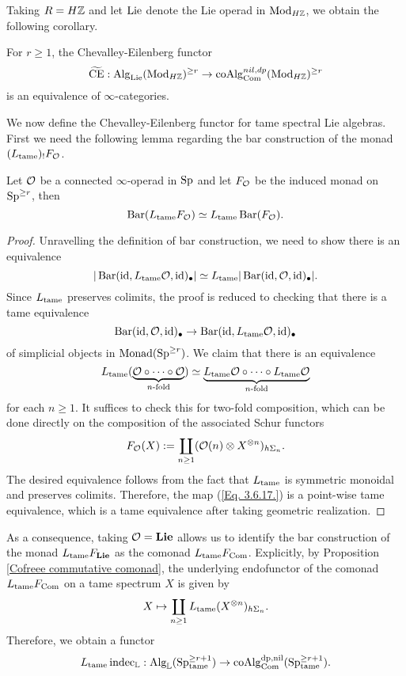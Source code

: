 Taking $R=H{\mathbb{Z}}$ and let $\operatorname{Lie}$ denote the Lie operad in $\operatorname{Mod}_{H{\mathbb{Z}}}$, we obtain the following corollary.
\begin{corollary}
	For $r\geq 1$, the Chevalley-Eilenberg functor 
	\[
	\widetilde{\operatorname{CE}}: \operatorname{Alg}_{\operatorname{Lie}}(\operatorname{Mod}_{H{\mathbb{Z}}})^{\geq r} \to \operatorname{coAlg}^{nil, dp}_{\operatorname{Com}}(\operatorname{Mod}_{H{\mathbb{Z}}})^{\geq r}
	\]
	is an equivalence of $\infty$-categories.
\end{corollary}

We now define the Chevalley-Eilenberg functor for tame spectral Lie algebras. First we need the following lemma regarding the bar construction of the monad $(L_{\operatorname{\operatorname{tame}}})_{!}F_{{\mathcal{O}}}$.
\begin{lemma}
    Let ${\mathcal{O}}$ be a connected $\infty$-operad in $ \operatorname{Sp}$ and let $F_{{\mathcal{O}}}$ be the induced monad on $\operatorname{Sp}^{\geq r}$,
    then 
    $$
    \operatorname{Bar}(L_{\operatorname{\operatorname{tame}}}F_{\mathcal{O}} ) \simeq L_{\operatorname{\operatorname{tame}}} \operatorname{Bar}(F_{\mathcal{O}}).
    $$
\end{lemma}
\begin{proof}
    Unravelling the definition of bar construction, we need to show there is an equivalence
    $$
     |\operatorname{Bar}(\operatorname{id}, L_{\operatorname{\operatorname{tame}}}{\mathcal{O}} , \operatorname{id})_{\bullet}|
     \simeq
     L_{\operatorname{\operatorname{tame}}}|\operatorname{Bar}(\operatorname{id}, {\mathcal{O}} , \operatorname{id})_{\bullet}|.
    $$
    Since $L_{\operatorname{\operatorname{tame}}}$ preserves colimits, the proof is reduced to checking that
    there is a tame equivalence
    \begin{equation}
    \label{Eq. 3.6.17.}
    \operatorname{Bar}(\operatorname{id}, {\mathcal{O}} , \operatorname{id})_{\bullet}
    \to 
    \operatorname{Bar}(\operatorname{id}, L_{\operatorname{\operatorname{tame}}}{\mathcal{O}} , \operatorname{id})_{\bullet}
    \end{equation}
    of simplicial objects in $\operatorname{Monad}(\operatorname{Sp}^{\geq r})$. 
    We claim that there is an equivalence
    $$
    L_{\operatorname{\operatorname{tame}}} (\underbrace{{\mathcal{O}} \circ \cdots \circ {\mathcal{O}}}_{\text{$n$-fold}} )
    \simeq 
    \underbrace{ L_{\operatorname{\operatorname{tame}}}{\mathcal{O}} \circ \cdots \circ  L_{\operatorname{\operatorname{tame}}}{\mathcal{O}}}_{\text{$n$-fold}} 
    $$
    for each $n\geq 1$.
    It suffices to check this for two-fold composition, which can be done directly on the composition of the associated Schur functors
    $$
    F_{{\mathcal{O}}}(X):= \coprod_{n\geq 1} ({\mathcal{O}}(n) \otimes X^{\otimes n})_{h\Sigma_n}.
    $$ 
    The desired equivalence follows from the fact that $L_{\operatorname{\operatorname{tame}}}$ is symmetric monoidal and preserves colimits.
    Therefore, the map (\ref{Eq. 3.6.17.}) is a point-wise tame equivalence, which is a tame equivalence after taking geometric realization.
\end{proof}

As a consequence, taking ${\mathcal{O}}=\mathbf{Lie}$ allows us to identify the bar construction of the monad $L_{\operatorname{\operatorname{tame}}}F_{\mathbf{Lie}}$ as the comonad $L_{\operatorname{\operatorname{tame}}}F_{\operatorname{Com}}$. Explicitly, by Proposition \ref{Cofreee commutative comonad}, the underlying endofunctor of the comonad $L_{\operatorname{\operatorname{tame}}}F_{\operatorname{Com}}$ on a tame spectrum $X$ is given by
$$
X \mapsto \coprod_{n\geq 1} L_{\operatorname{\operatorname{tame}}} (X^{\otimes n})_{h\Sigma_n}.
$$
Therefore, we obtain a functor 
$$
L_{\operatorname{\operatorname{tame}}} \operatorname{indec}_{{\mathbb{L}}}:
\operatorname{Alg}_{{\mathbb{L}}}(\operatorname{Sp}^{\geq r+1}_{\operatorname{\operatorname{tame}}})
\to
\operatorname{coAlg}^{\operatorname{dp}, \operatorname{nil}}_{\operatorname{Com}}(\operatorname{Sp}^{\geq r+1}_{\operatorname{\operatorname{tame}}}).
$$

